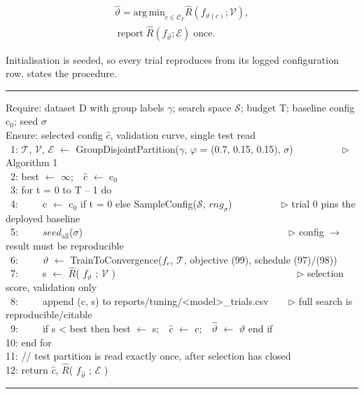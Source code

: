 \begin{equation}
\label{eq:103}
\begin{aligned}
\hat{\vartheta } = \mathrm{arg\,\mathrm{min}}_{c \in \mathcal{C}_T} \hat{R}( f_{\vartheta (c)} ; \mathcal{V} ), \\
\;\text{report}\; \hat{R}( f_{\hat{\vartheta }} ; \mathcal{E} ) \;\text{once}.
\end{aligned}
\end{equation}

Initialisation is seeded, so every trial reproduces from its logged configuration row.  states the procedure.

\begin{algorithm}[htbp]
\caption{Pinned-baseline random search under the corrected protocol}
\label{alg:3}
\hrule\vspace{3pt}
{\ttfamily\scriptsize\raggedright
Require: dataset D with group labels $\gamma$; search space $\mathcal{S}$; budget T; baseline config c$_{0}$; seed $\sigma$ \\
Ensure: selected config $\hat{c}$, validation curve, single test read \\
~1: $\mathcal{T}$, $\mathcal{V}$, $\mathcal{E}$ $\leftarrow$ GroupDisjointPartition($\gamma$, $\varphi$ = (0.7, 0.15, 0.15), $\sigma$)~~~~~~~~~~$\triangleright$ Algorithm 1 \\
~2: best $\leftarrow$ $\infty$;~~$\hat{c}$ $\leftarrow$ c$_{0}$ \\
~3: for t = 0 to T -- 1 do \\
~4:~~~~~c $\leftarrow$ c$_{0}$ if t = 0 else SampleConfig($\mathcal{S}$, $rng_{\sigma}$)~~~~~~~~~~$\triangleright$ trial 0 pins the deployed baseline \\
~5:~~~~~$seed_{\mathrm{all}}$($\sigma$)~~~~~~~~~~~~~~~~~~~~~~~~~~~~~~~~~~~~~~~~~~$\triangleright$ config $\to$ result must be reproducible \\
~6:~~~~~$\vartheta$ $\leftarrow$ TrainToConvergence($f_{c}$, $\mathcal{T}$, objective (99), schedule (97)/(98)) \\
~7:~~~~~s $\leftarrow$ $\hat{R}$( $f_{\vartheta}$ ; $\mathcal{V}$ )~~~~~~~~~~~~~~~~~~~~~~~~~~~~~~~~~~~~~$\triangleright$ selection score, validation only \\
~8:~~~~~append (c, s) to reports/tuning/<model>\_trials.csv~~~~$\triangleright$ full search is reproducible/citable \\
~9:~~~~~if s < best then best $\leftarrow$ s;~~$\hat{c}$ $\leftarrow$ c;~~$\hat{\vartheta }$ $\leftarrow$ $\vartheta$ end if \\
10: end for \\
11: // test partition is read exactly once, after selection has closed \\
12: return $\hat{c}$, $\hat{R}$( $f_{\hat{\vartheta }}$ ; $\mathcal{E}$ )
\par}
\vspace{3pt}\hrule
\end{algorithm}

